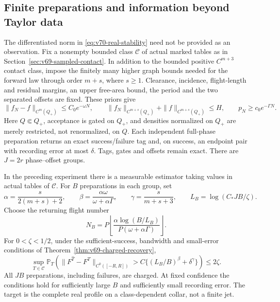\subsection{Finite preparations and information beyond Taylor data}

The differentiated norm in \eqref{eq:v70-real-stability} need not be
provided as an observation.  Fix a nonempty bounded class $\mathscr C$
of actual marked tables as in Section~\ref{sec:v69-sampled-contact}.
In addition to the bounded positive $C^{m+3}$ contact class, impose the
finitely many higher graph bounds needed for the forward law through
order $m+s$, where $s\ge1$.  Clearance, incidence, flight-length and
residual margins, an upper free-area bound, the period and the two
separated offsets are fixed.  These priors give
\[
 \|f_N-f\|_{C^m(Q_+)}\le C_0e^{-\omega N},\qquad
 \|f_N\|_{C^{m+s}(Q_+)}+\|f\|_{C^{m+s}(Q_+)}\le H,
 \qquad p_N\ge c_0e^{-\Gamma N}.
\]
Here $Q\Subset Q_+$, acceptance is gated on $Q_+$, and densities
normalized on $Q_+$ are merely restricted, not renormalized, on $Q$.
Each independent full-phase preparation returns an exact success/failure
tag and, on success, an endpoint pair with recording error at most
$\delta$.  Tags, gates and offsets remain exact.  There are $J=2r$
phase--offset groups.

\begin{theorem}
\label{thm:v70-finite}
In the preceding experiment there is a measurable estimator taking values
in actual tables of $\mathscr C$.  For $B$ preparations in each group,
set
\[
 \alpha=\frac{s}{2(m+s)+2},\qquad
 \beta=\frac{\alpha\omega}{\omega+\alpha\Gamma},\qquad
 \gamma=\frac{s}{m+s+3},\qquad L_B=\log(C_*JB/\zeta).
\]
Choose the returning flight number
\[
 N_B=P\left\lfloor
 \frac{\alpha\log(B/L_B)}{P(\omega+\alpha\Gamma)}
 \right\rfloor.
\]
For $0<\zeta<1/2$, under the sufficient-success, bandwidth and
small-error conditions of Theorem~\ref{thm:v69-charged-recovery},
\begin{equation}\label{eq:v70-finite-rate}
 \sup_{T\in\mathscr C}\mathbb P_T\!\left(
 \|F^{\widehat T}-F^T\|_{C^0([-R,R])}>
 C\{(L_B/B)^\beta+\delta^\gamma\}\right)\le2\zeta.
\end{equation}
All $JB$ preparations, including failures, are charged.  At fixed
confidence the conditions hold for sufficiently large $B$ and
sufficiently small recording error.  The target is the complete real
profile on a class-dependent collar, not a finite jet.
\end{theorem}

